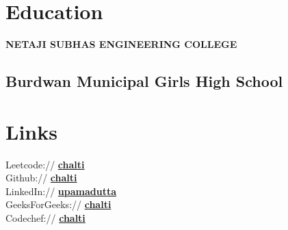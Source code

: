 \documentclass[]{deedy-resume-openfont}
\begin{document}
%
%

%
%

%
%

\begin{minipage}[t]{0.33\textwidth} 


\section{Education} 
\textbf{NETAJI SUBHAS ENGINEERING COLLEGE}
\sectionsep

\subsection{Burdwan Municipal Girls High School}
\sectionsep



\section{Links} 
Leetcode:// \href{https://leetcode.com/chalti_46/}{\bf chalti} \\
Github:// \href{https://github.com/chaltidutta}{\bf chalti} \\
LinkedIn://  \href{https://www.linkedin.com/in/upama-dutta-she-her-879341192/}{\bf upamadutta} \\
GeeksForGeeks://  \href{https://auth.geeksforgeeks.org/user/chalti/practice/}{\bf chalti} \\
Codechef://  \href{https://www.codechef.com/users/upama677}{\bf chalti} 


\end{minipage}
\end{document}
